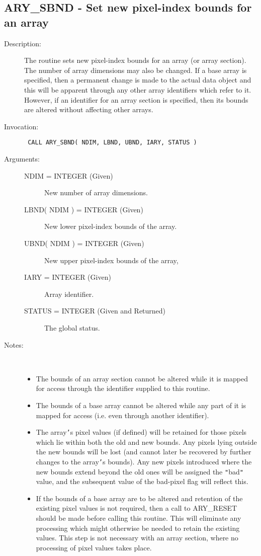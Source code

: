 \documentclass[twoside,11pt]{article}
\newcommand{\xlabel}[1]{}
\newlength{\sstbannerlength}
\newlength{\sstcaptionlength}
\newlength{\sstexampleslength}
\newlength{\sstexampleswidth}
\newcommand{\sstroutine}[3]{
   \goodbreak
   \rule{\textwidth}{0.5mm}
   \vspace{-7ex}
   \newline
   \settowidth{\sstbannerlength}{{\Large {\bf #1}}}
   \setlength{\sstcaptionlength}{\textwidth}
   \setlength{\sstexampleslength}{\textwidth}
   \addtolength{\sstbannerlength}{0.5em}
   \addtolength{\sstcaptionlength}{-2.0\sstbannerlength}
   \addtolength{\sstcaptionlength}{-5.0pt}
   \settowidth{\sstexampleswidth}{{\bf Examples:}}
   \addtolength{\sstexampleslength}{-\sstexampleswidth}
   \parbox[t]{\sstbannerlength}{\flushleft{\Large {\bf #1}}}
   \parbox[t]{\sstcaptionlength}{\center{\Large #2}}
   \parbox[t]{\sstbannerlength}{\flushright{\Large {\bf #1}}}
   \begin{description}
      #3
   \end{description}
}
\newcommand{\sstdescription}[1]{\item[Description:] #1}
\newcommand{\sstinvocation}[1]{\item[Invocation:]\hspace{0.4em}{\tt #1}}
\newcommand{\sstarguments}[1]{
   \item[Arguments:] \mbox{} \\
   \vspace{-3.5ex}
   \begin{description}
      #1
   \end{description}
}
\newcommand{\sstsubsection}[1]{ \item[{#1}] \mbox{} \\}
\newcommand{\sstnotes}[1]{\item[Notes:] \mbox{} \\[1.3ex] #1}
\newcommand{\sstitemlist}[1]{
  \mbox{} \\
  \vspace{-3.5ex}
  \begin{itemize}
     #1
  \end{itemize}
}
\newcommand{\sstitem}{\item}
\newcommand{\ssttt}{\tt}
\renewcommand{\sstroutine}[3]{
      \subsection{#1\xlabel{#1}-\label{#1}#2}
      \begin{description}
         #3
      \end{description}
   }
\renewcommand{\sstdescription}[1]{\item[Description:]
      \begin{description}
         #1
      \end{description}
   }
\renewcommand{\sstinvocation}[1]{\item[Invocation:]
      \begin{description}
         {\ssttt #1}
      \end{description}
   }
\renewcommand{\sstarguments}[1]{
      \item[Arguments:]
      \begin{description}
         #1
      \end{description}
   }
\renewcommand{\sstsubsection}[1]{\item[{#1}]}
\renewcommand{\sstnotes}[1]{\item[Notes:]
      \begin{description}
         #1
      \end{description}
   }
\newcommand{\sstitemlist}[1]{
      \begin{itemize}
         #1
      \end{itemize}
   }
\begin{document}
\sstroutine{
   ARY\_SBND
}{
   Set new pixel-index bounds for an array
}{
   \sstdescription{
      The routine sets new pixel-index bounds for an array (or array
      section). The number of array dimensions may also be changed.  If
      a base array is specified, then a permanent change is made to the
      actual data object and this will be apparent through any other
      array identifiers which refer to it.  However, if an identifier
      for an array section is specified, then its bounds are altered
      without affecting other arrays.
   }
   \sstinvocation{
      CALL ARY\_SBND( NDIM, LBND, UBND, IARY, STATUS )
   }
   \sstarguments{
      \sstsubsection{
         NDIM = INTEGER (Given)
      }{
         New number of array dimensions.
      }
      \sstsubsection{
         LBND( NDIM ) = INTEGER (Given)
      }{
         New lower pixel-index bounds of the array.
      }
      \sstsubsection{
         UBND( NDIM ) = INTEGER (Given)
      }{
         New upper pixel-index bounds of the array,
      }
      \sstsubsection{
         IARY = INTEGER (Given)
      }{
         Array identifier.
      }
      \sstsubsection{
         STATUS = INTEGER (Given and Returned)
      }{
         The global status.
      }
   }
   \sstnotes{
      \sstitemlist{

         \sstitem
         The bounds of an array section cannot be altered while it is
         mapped for access through the identifier supplied to this
         routine.

         \sstitem
         The bounds of a base array cannot be altered while any part of
         it is mapped for access (i.e. even through another identifier).

         \sstitem
         The array{\tt '}s pixel values (if defined) will be retained for
         those pixels which lie within both the old and new bounds. Any
         pixels lying outside the new bounds will be lost (and cannot
         later be recovered by further changes to the array{\tt '}s bounds).
         Any new pixels introduced where the new bounds extend beyond the
         old ones will be assigned the {\tt "}bad{\tt "} value, and the subsequent
         value of the bad-pixel flag will reflect this.

         \sstitem
         If the bounds of a base array are to be altered and retention
         of the existing pixel values is not required, then a call to
         ARY\_RESET should be made before calling this routine. This will
         eliminate any processing which might otherwise be needed to
         retain the existing values. This step is not necessary with an
         array section, where no processing of pixel values takes place.
      }
   }
}
\end{document}
